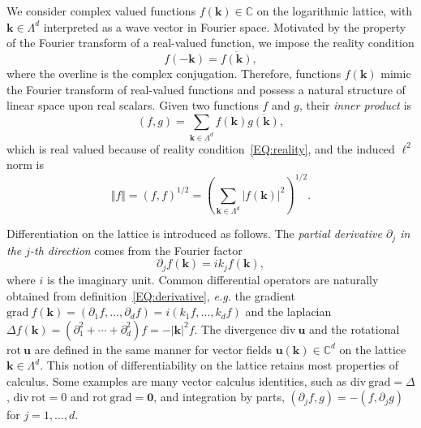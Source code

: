 \documentclass[12pt]{article}
\theoremstyle{definition}
\begin{document}
	We consider complex valued functions $f(\mathbf{k}) \in \mathbb{C}$ on the logarithmic lattice, with $\mathbf{k} \in \mathbb{\Lambda}^d$ interpreted as a wave vector in Fourier space.
	Motivated by the property of the Fourier transform of a real-valued function, we impose the reality condition
	\begin{equation}
	f(-\mathbf{k}) = \overline{f(\mathbf{k})},
	\label{EQ:reality}
	\end{equation}
	where the overline is the complex conjugation.
	Therefore, functions $f(\mathbf{k})$ mimic the Fourier transform of real-valued functions and possess a natural structure of linear space upon real scalars.
	Given two functions $f$ and $g$, their \textit{inner product} is
	\begin{equation}
	(f,g) = \sum_{\mathbf{k} \in \mathbb{\Lambda}^d}f(\mathbf{k}) \overline{g(\mathbf{k})},
	\label{EQ:inner_product}
	\end{equation}
	which is real valued because of reality condition~\eqref{EQ:reality}, and the induced $\ell^2$ norm is
	\begin{equation}
	\Vert f \Vert = (f,f)^{1/2} = \left(\sum_{\mathbf{k} \in \mathbb{\Lambda}^d}|f(\mathbf{k})|^2\right)^{1/2}.
	\label{EQ:l2norm}
	\end{equation}
	
	Differentiation on the lattice is introduced as follows.
	The \textit{partial derivative $\partial_j$ in the $j$-th direction} comes from the Fourier factor
	\begin{equation}
	\partial_j f(\mathbf{k}) = ik_j f(\mathbf{k}),
	\label{EQ:derivative}
	\end{equation}
	where $i$ is the imaginary unit.
	Common differential operators are naturally obtained from definition~\eqref{EQ:derivative}, \textit{e.g.} the gradient $\text{grad} \ f (\mathbf{k})= (\partial_1f, \dots, \partial_d f) = i(k_1f,\dots,k_df)$ and the laplacian $\Delta f (\mathbf{k})= (\partial^2_1 + \cdots + \partial^2_d)f = -|\mathbf{k}|^2f$.
	The divergence $\text{div} \ \mathbf{u}$ and the rotational $\text{rot} \ \mathbf{u}$ are defined in the same manner for vector fields $\mathbf{u}(\mathbf{k}) \in \mathbb{C}^d$ on the lattice $\mathbf{k} \in \mathbb{\Lambda}^d$.
	This notion of differentiability on the lattice retains most properties of calculus.
	Some examples are many vector calculus identities, such as $\text{div} \ \text{grad} = \Delta$, $\text{div} \ \text{rot} = 0$ and $\text{rot} \ \text{grad} = \mathbf{0}$, and integration by parts, $(\partial_j f, g) = - (f,\partial_j g)$ for $j = 1,\dots,d$.
	
\end{document}
